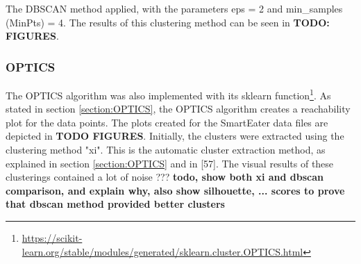 The DBSCAN method applied, with the parameters eps = 2 and min\_samples (MinPts) = 4.  The results of this clustering method can be seen in \textbf{TODO: FIGURES}.



\subsubsection{OPTICS}
The OPTICS algorithm was also implemented with its sklearn function\footnote{\url{https://scikit-learn.org/stable/modules/generated/sklearn.cluster.OPTICS.html}}. As stated in section \ref{section:OPTICS}, the OPTICS algorithm creates a reachability plot for the data points. The plots created for the SmartEater data files are depicted in \textbf{TODO FIGURES}. Initially, the clusters were extracted using the clustering method "xi". This is the automatic cluster extraction method, as explained in section \ref{section:OPTICS} and in \textcite{OPTICS}[57]. The visual results of these clusterings contained a lot of noise ??? \textbf{todo, show both xi and dbscan comparison, and explain why, also show silhouette, ... scores to prove that dbscan method provided better clusters}










